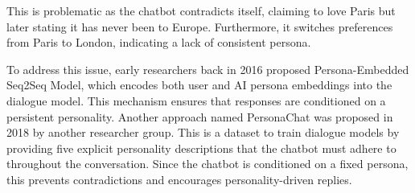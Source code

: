 \documentclass[10pt]{article}
\begin{document}
\begin{description}
\begin{enumerate}
    This is problematic as the chatbot contradicts itself, claiming to love Paris but later stating it has never been to Europe.
    Furthermore, it switches preferences from Paris to London, indicating a lack of consistent persona. 
    
    To address this issue, early researchers back in 2016 proposed Persona-Embedded Seq2Seq Model, which encodes both user and AI persona embeddings into the dialogue model.
    This mechanism ensures that responses are conditioned on a persistent personality. Another approach named PersonaChat was proposed in 2018 by another researcher group.
    This is a dataset to train dialogue models by providing five explicit personality descriptions that the chatbot must adhere to throughout the conversation.
    Since the chatbot is conditioned on a fixed persona, this prevents contradictions and encourages personality-driven replies.

\end{enumerate}

\end{description}
\end{document}
